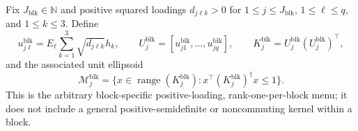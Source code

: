 Fix \(J_{\mathrm{blk}}\in\mathbb N\) and positive squared loadings \(d_{j\ell k}>0\) for \(1\le j\le J_{\mathrm{blk}}\), \(1\le\ell\le q\), and \(1\le k\le3\). Define
\[
u^{\mathrm{blk}}_{j\ell}
=E_\ell\sum_{k=1}^3\sqrt{d_{j\ell k}}h_k,
\qquad
U_j^{\mathrm{blk}}=[u^{\mathrm{blk}}_{j1},\ldots,u^{\mathrm{blk}}_{jq}],
\qquad
K_j^{\mathrm{blk}}=U_j^{\mathrm{blk}}(U_j^{\mathrm{blk}})^\top,
\]
and the associated unit ellipsoid
\[
\mathcal M_j^{\mathrm{blk}}
=\{x\in\operatorname{range}(K_j^{\mathrm{blk}}):
x^\top(K_j^{\mathrm{blk}})^\dagger x\le1\}.
\]
This is the arbitrary block-specific positive-loading, rank-one-per-block menu; it does not include a general positive-semidefinite or noncommuting kernel within a block.